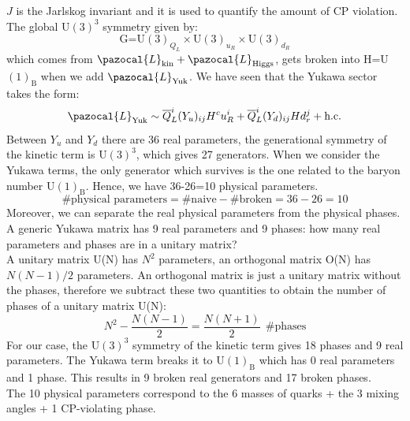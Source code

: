\documentclass[../main.tex]{subfiles}
\begin{document}
$J$ is the Jarlskog invariant and it is used to quantify the amount of CP violation. The global U$(3)^3$ symmetry given by:
\[
\text{G=U$(3)_{Q_L}\times$U$(3)_{u_R}\times$U$(3)_{d_R}$}
\]
which comes from $\pazocal{L}_{\text{kin}}+\pazocal{L}_{\text{Higgs}}$, gets broken into H=U$(1)_{\text{B}}$ when we add $\pazocal{L}_{\text{Yuk}}$. We have seen that the Yukawa sector takes the form:
\[
\pazocal{L}_{\text{Yuk}}\sim\overline{Q}_L^i(Y_u)_{ij}H^cu_R^i+\overline{Q}_L^i(Y_d)_{ij}Hd_r^j+\text{h.c.}
\]
Between $Y_u$ and $Y_d$ there are 36 real parameters, the generational symmetry of the kinetic term is U$(3)^3$, which gives 27 generators. When we consider the Yukawa terms, the only generator which survives is the one related to the baryon number U$(1)_{\text{B}}$. Hence, we have 36-26=10 physical parameters.
\[
\text{\# physical parameters}=\#\text{naive}-\#\text{broken}=36-26=10
\]
Moreover, we can separate the real physical parameters from the physical phases. A generic Yukawa matrix has 9 real parameters and 9 phases: how many real parameters and phases are in a unitary matrix?\\
A unitary matrix U(N) has $N^2$ parameters, an orthogonal matrix O(N) has $N(N-1)/2$ parameters. An orthogonal matrix is just a unitary matrix without the phases, therefore we subtract these two quantities to obtain the number of phases of a unitary matrix U(N):
\[
N^2-\frac{N(N-1)}{2}=\frac{N(N+1)}{2}\,\;\text{\# phases}
\]
For our case, the U$(3)^3$ symmetry of the kinetic term gives 18 phases and 9 real parameters. The Yukawa term breaks it to U$(1)_{\text{B}}$ which has 0 real parameters and 1 phase. This results in 9 broken real generators and 17 broken phases.\\
The 10 physical parameters correspond to the 6 masses of quarks + the 3 mixing angles + 1 CP-violating phase.
\end{document}
